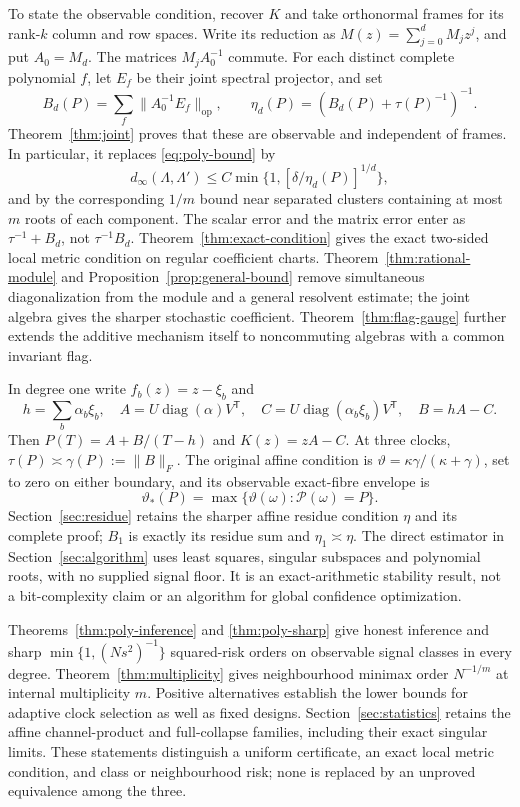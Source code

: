 \documentclass[11pt,reqno]{amsart}
\numberwithin{equation}{section}
\theoremstyle{definition}\newtheorem{definition}[theorem]{Definition}
\theoremstyle{remark}\newtheorem{remark}[theorem]{Remark}
\newcommand{\diag}{\operatorname{diag}}
\newcommand{\op}{\mathrm{op}}
\newcommand{\sig}{\vartheta}
\begin{document}
To state the observable condition, recover $K$ and take orthonormal
frames for its rank-$k$ column and row spaces. Write its reduction as
$M(z)=\sum_{j=0}^dM_jz^j$, and put $A_0=M_d$.
The matrices $M_jA_0^{-1}$ commute. For each distinct complete
polynomial $f$, let $E_f$ be their joint spectral projector, and set
\[
 B_d(P)=\sum_f\|A_0^{-1}E_f\|_\op,
 \qquad \eta_d(P)=(B_d(P)+\tau(P)^{-1})^{-1}.
\]
Theorem~\ref{thm:joint} proves that these are observable and independent
of frames. In particular, it replaces \eqref{eq:poly-bound} by
\[
 d_\infty(\Lambda,\Lambda')
       \le C\min\{1,[\delta/\eta_d(P)]^{1/d}\},
\]
and by the corresponding $1/m$ bound near separated clusters containing
at most $m$ roots of each component. The scalar error and the matrix
error enter as $\tau^{-1}+B_d$, not $\tau^{-1}B_d$.
Theorem~\ref{thm:exact-condition} gives the exact two-sided local metric
condition on regular coefficient charts. Theorem~\ref{thm:rational-module}
and Proposition~\ref{prop:general-bound} remove simultaneous
diagonalization from the module and a general resolvent estimate;
the joint algebra gives the sharper stochastic coefficient.
Theorem~\ref{thm:flag-gauge} further extends the additive mechanism itself
to noncommuting algebras with a common invariant flag.

In degree one write $f_b(z)=z-\xi_b$ and
\begin{equation}\label{eq:affine}
 h=\sum_b\alpha_b\xi_b,\quad
 A=U\diag(\alpha)V^{\mathsf T},\quad
 C=U\diag(\alpha_b\xi_b)V^{\mathsf T},\quad B=hA-C.
\end{equation}
Then $P(T)=A+B/(T-h)$ and $K(z)=zA-C$. At three clocks,
$\tau(P)\asymp\gamma(P):=\|B\|_F$. The original affine condition is
$\sig=\kappa\gamma/(\kappa+\gamma)$, set to zero on either boundary,
and its observable exact-fibre envelope is
\begin{equation}\label{eq:envelope}
 \sig_*(P)=\max\{\sig(\omega):\mathcal P(\omega)=P\}.
\end{equation}
Section~\ref{sec:residue} retains the sharper affine residue condition
$\eta$ and its complete proof; $B_1$ is exactly its residue sum and
$\eta_1\asymp\eta$. The direct estimator in Section~\ref{sec:algorithm}
uses least squares, singular subspaces and polynomial roots, with no
supplied signal floor. It is an exact-arithmetic stability result, not
a bit-complexity claim or an algorithm for global confidence optimization.

Theorems~\ref{thm:poly-inference} and \ref{thm:poly-sharp} give honest
inference and sharp $\min\{1,(Ns^2)^{-1}\}$ squared-risk orders on
observable signal classes in every degree. Theorem~\ref{thm:multiplicity}
gives neighbourhood minimax order $N^{-1/m}$ at internal multiplicity
$m$. Positive alternatives establish the lower bounds for adaptive
clock selection as well as fixed designs. Section~\ref{sec:statistics}
retains the affine channel-product and full-collapse families, including
their exact singular limits. These statements distinguish a uniform
certificate, an exact local metric condition, and class or neighbourhood
risk; none is replaced by an unproved equivalence among the three.
\end{document}
